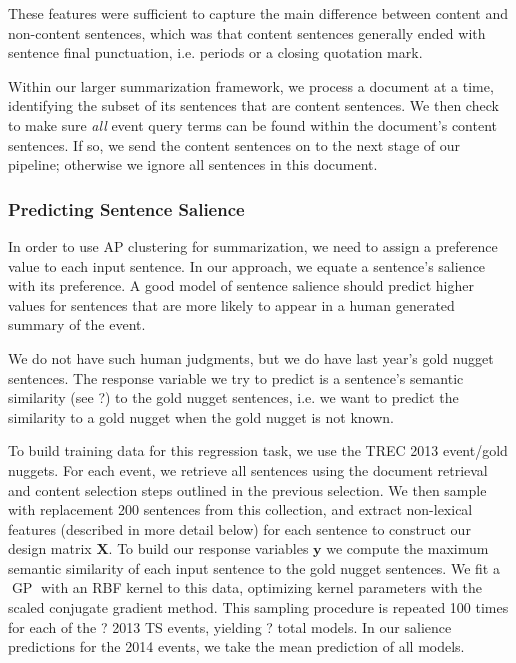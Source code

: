 These features were sufficient to capture 
the main difference between content and non-content sentences,
which 
was that content sentences generally ended with sentence final punctuation, 
i.e. periods or a closing quotation mark. 

Within our larger summarization framework, we process a document at a time,
identifying the subset of its sentences that are content sentences.
We then check to make sure \emph{all} event
query terms can be found within the document's content sentences. If so,
we send the content sentences on to the next stage of our pipeline; otherwise
we ignore all sentences in this document.

\subsubsection{Predicting Sentence Salience}\label{subsec:Predict}

In order to use AP clustering for summarization, we need to assign a
preference value to each input sentence.  In our approach, we equate a
sentence's salience with its preference.  A good model of sentence salience
should predict higher values for sentences that are more likely to appear in a
human generated summary of the event. 

We do not have such human judgments, but we do have last year's gold nugget
sentences.
The response variable we try to predict is a sentence's semantic similarity
(see ?) to the gold nugget sentences, i.e. we want to predict the similarity
to a gold nugget when the gold nugget is not known.


To build training data for this regression task, 
we use the TREC 2013 event/gold nuggets. For each event, we retrieve all 
sentences using the document retrieval and content selection steps outlined
in the previous selection. We then sample with replacement 200 sentences
from this collection, and extract non-lexical features (described in more 
detail below) for each sentence
to construct our design matrix $\mathbf{X}$. To build our response variables
$\mathbf{y}$ we compute the maximum semantic similarity of each input
sentence to the gold nugget sentences. We fit a $\operatorname{GP}$ with
an RBF kernel to this data, optimizing kernel parameters with the scaled 
conjugate gradient method. This sampling procedure is repeated 100 times
for each of the ? 2013 TS events, yielding ? total models. In our salience 
predictions for the 2014 events, we take the mean prediction of all models.

